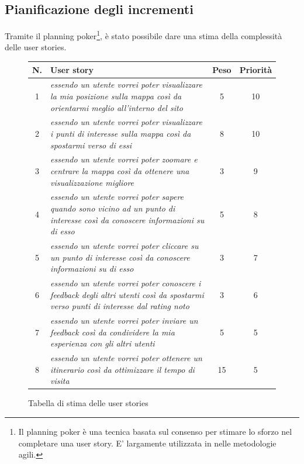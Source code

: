 \subsection{Pianificazione degli incrementi}
Tramite il planning poker\footnote{Il planning poker è una tecnica basata sul consenso per stimare lo sforzo nel completare una user story. E' largamente utilizzata in nelle metodologie agili.}, è stato possibile dare una stima della complessità delle user stories.

\begin{figure}[h!]
\begin{center}
\begin{tabular}[c]{|c|p{7cm}|c|c|}
\hline
N. & User story & Peso & Priorità\\
\hline
1 & \textit{essendo un utente vorrei poter visualizzare la mia posizione sulla mappa così da orientarmi meglio all'interno del sito} & 5 & 10\\
\hline
2 & \textit{essendo un utente vorrei poter visualizzare i punti di interesse sulla mappa così da spostarmi verso di essi} & 8 & 10\\
\hline
3 & \textit{essendo un utente vorrei poter zoomare e centrare la mappa così da ottenere una visualizzazione migliore} & 3 & 9\\
\hline
4 & \textit{essendo un utente vorrei poter sapere quando sono vicino ad un punto di interesse così da conoscere informazioni su di esso} & 5 & 8\\
\hline
5 & \textit{essendo un utente vorrei poter cliccare su un punto di interesse così da conoscere informazioni su di esso} & 3 & 7\\
\hline
6 & \textit{essendo un utente vorrei poter conoscere i feedback degli altri utenti così da spostarmi verso punti di interesse dal rating noto} & 3 & 6\\
\hline
7 & \textit{essendo un utente vorrei poter inviare un feedback così da condividere la mia esperienza con gli altri utenti} & 5 & 5\\
\hline
8 & \textit{essendo un utente vorrei poter ottenere un itinerario così da ottimizzare il tempo di visita} & 15 & 5\\
\hline
\end{tabular}
\caption{Tabella di stima delle user stories\label{userstoriestable}}
\end{center}
\end{figure}
\clearpage


